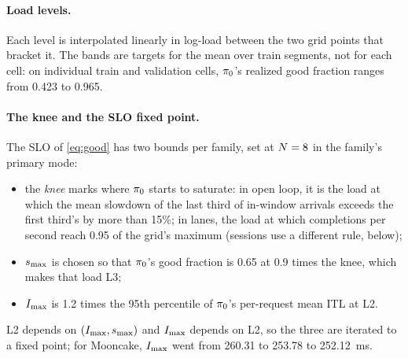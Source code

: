 \paragraph{Load levels.}
Each level is interpolated linearly in log-load between the two grid points that bracket it.
The bands are targets for the mean over train segments, not for each cell: on individual train
and validation cells, $\pi_{0}$'s realized good fraction ranges from 0.423 to 0.965.

\paragraph{The knee and the SLO fixed point.}
The SLO of \cref{eq:good} has two bounds per family, set at $N = 8$ in the family's primary
mode:
\begin{itemize}
  \item the \emph{knee} marks where $\pi_{0}$ starts to saturate: in open loop, it is the load at
    which the mean slowdown of the last third of in-window arrivals exceeds the first third's by
    more than 15\%; in lanes, the load at which completions per second reach 0.95 of the grid's
    maximum (sessions use a different rule, below);
  \item $s_{\max}$ is chosen so that $\pi_{0}$'s good fraction is 0.65 at 0.9 times the knee, which
    makes that load L3;
  \item $I_{\max}$ is 1.2 times the 95th percentile of $\pi_{0}$'s per-request mean ITL at L2.
\end{itemize}
L2 depends on $(I_{\max},s_{\max})$ and $I_{\max}$ depends on L2, so the three are iterated to a fixed
point; for Mooncake, $I_{\max}$ went from 260.31 to 253.78 to \SI{252.12}{ms}.

